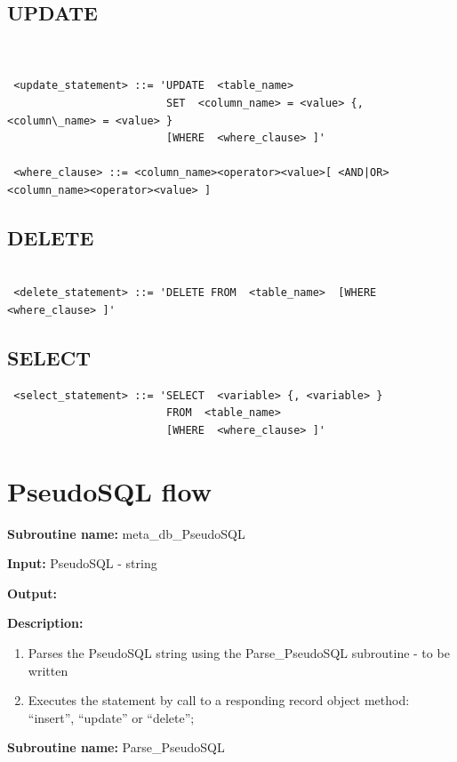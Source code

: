 \subsection{UPDATE}

\begin{verbatim}


 <update_statement> ::= 'UPDATE  <table_name>
                         SET  <column_name> = <value> {, <column\_name> = <value> }
                         [WHERE  <where_clause> ]'

 <where_clause> ::= <column_name><operator><value>[ <AND|OR> <column_name><operator><value> ]

\end{verbatim}

\subsection{DELETE}

\begin{verbatim}

 <delete_statement> ::= 'DELETE FROM  <table_name>  [WHERE  <where_clause> ]'

\end{verbatim}

\subsection{SELECT}

\begin{verbatim}
 <select_statement> ::= 'SELECT  <variable> {, <variable> }
                         FROM  <table_name>
                         [WHERE  <where_clause> ]'

\end{verbatim}

\section{PseudoSQL flow}

\textbf{Subroutine name:} meta\_db\_PseudoSQL

\textbf{Input:} PseudoSQL - string

\textbf{Output:} 

\textbf{Description:}

\begin{enumerate}
\item Parses the PseudoSQL string using the Parse\_PseudoSQL subroutine
- to be written 
\item Executes the statement by call to a responding record object method:
{}``insert'', {}``update'' or {}``delete'';
\end{enumerate}
\textbf{Subroutine name:} Parse\_PseudoSQL

